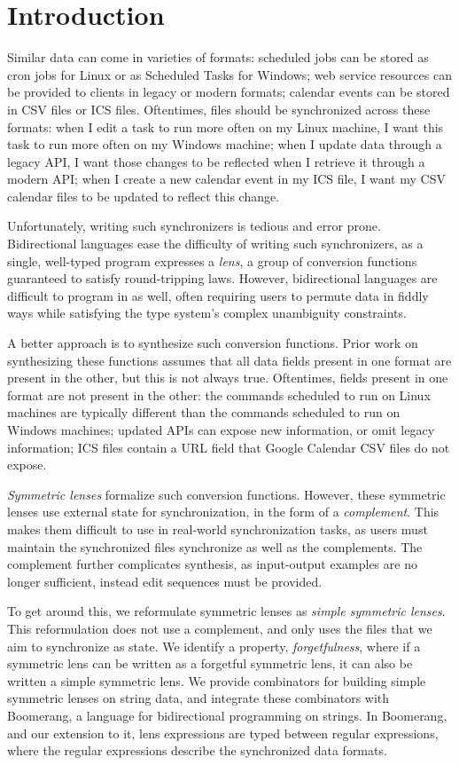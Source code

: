 \documentclass[acmsmall,screen,anonymous]{acmart}
\begin{document}
\section{Introduction}
Similar data can come in varieties of formats: scheduled jobs can be stored as
cron jobs for Linux or as Scheduled Tasks for Windows; web service resources can
be provided to clients in legacy or modern formats; calendar events can be
stored in CSV files or ICS files. Oftentimes, files should be synchronized
across these formats: when I edit a task to run more often on my Linux machine,
I want this task to run more often on my Windows machine; when I update data
through a legacy API, I want those changes to be reflected when I retrieve it
through a modern API; when I create a new calendar event in my ICS file, I want
my CSV calendar files to be updated to reflect this change.

Unfortunately, writing such synchronizers is tedious and error prone.
Bidirectional languages ease the difficulty of writing such synchronizers, as a
single, well-typed program expresses a \emph{lens}, a group of conversion
functions guaranteed to satisfy round-tripping laws. However, bidirectional
languages are difficult to program in as well, often requiring users to permute
data in fiddly ways while satisfying the type system's complex unambiguity
constraints.

A better approach is to synthesize such conversion functions. Prior work on
synthesizing these functions assumes that all data fields present in one format
are present in the other, but this is not always true. Oftentimes, fields
present in one format are not present in the other: the commands scheduled to
run on Linux machines are typically different than the commands scheduled to run
on Windows machines; updated APIs can expose new information, or omit legacy
information; ICS files contain a URL field that Google Calendar CSV files do not
expose.

\emph{Symmetric lenses} formalize such conversion functions. However, these
symmetric lenses use external state for synchronization, in the form of a
\emph{complement}. This makes them difficult to use in real-world
synchronization tasks, as users must maintain the synchronized files synchronize
as well as the complements. The complement further complicates synthesis, as
input-output examples are no longer sufficient, instead edit sequences must be
provided.

To get around this, we reformulate symmetric lenses as \emph{simple symmetric
  lenses}. This reformulation does not use a complement, and only uses the files
that we aim to synchronize as state. We identify a property,
\emph{forgetfulness}, where if a symmetric lens can be written as a forgetful
symmetric lens, it can also be written a simple symmetric lens. We provide
combinators for building simple symmetric lenses on string data, and integrate
these combinators with Boomerang, a language for bidirectional programming on
strings. In Boomerang, and our extension to it, lens expressions are typed
between regular expressions, where the regular expressions describe the
synchronized data formats.
\end{document}
